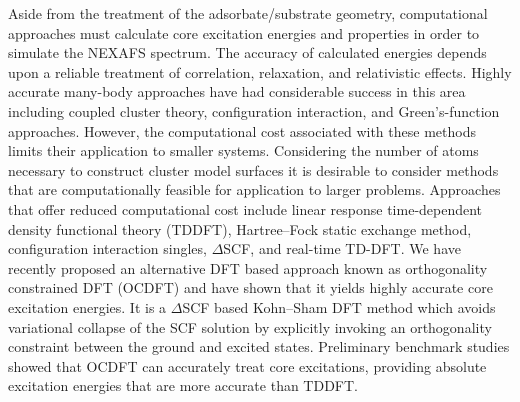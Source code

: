 \documentclass{article}
\begin{document}
Aside from the treatment of the adsorbate/substrate geometry, computational approaches must calculate core excitation energies and properties in order to simulate the NEXAFS spectrum. The accuracy of calculated energies depends upon a reliable treatment of correlation, relaxation, and relativistic effects. Highly accurate many-body approaches have had considerable success in this area including coupled cluster theory,\cite{fransson_carbon_2013,besley_equation_2012,coriani_coupled-cluster_2012,coriani_asymmetric-lanczos-chain-driven_2012,myhre_near-edge_2016} configuration interaction,\cite{maganas_combined_2014,maganas_l-edge_2014,grimme_density_1996} and Green's-function approaches.\cite{wenzel_calculating_2014,wenzel_analysis_2015,wenzel_calculating_2014,wenzel_physical_2016} However, the computational cost associated with these methods limits their application to smaller systems. Considering the number of atoms necessary to construct cluster model surfaces it is desirable to consider methods that are computationally feasible for application to larger problems. Approaches that offer reduced computational cost include linear response time-dependent density functional theory (TDDFT),\cite{imamura_time-dependent_2006,besley_time-dependent_2007,lestrange_calibration_2015}  Hartree--Fock static exchange method, configuration interaction singles,\cite{asmuruf_calculation_2008} $\Delta$SCF, and real-time TD-DFT.\cite{lopata_linear-response_2012} We have recently proposed an alternative DFT based approach known as orthogonality constrained DFT (OCDFT)\cite{evangelista_orthogonality_2013} and have shown that it yields highly accurate core excitation energies.\cite{derricotte_simulation_2015,verma_predicting_2016} It is a $\Delta$SCF based Kohn--Sham DFT method which avoids variational collapse of the SCF solution by explicitly invoking an orthogonality constraint between the ground and excited states. Preliminary benchmark studies showed that OCDFT can accurately treat core excitations, providing absolute excitation energies that are more accurate than TDDFT.
\end{document}
